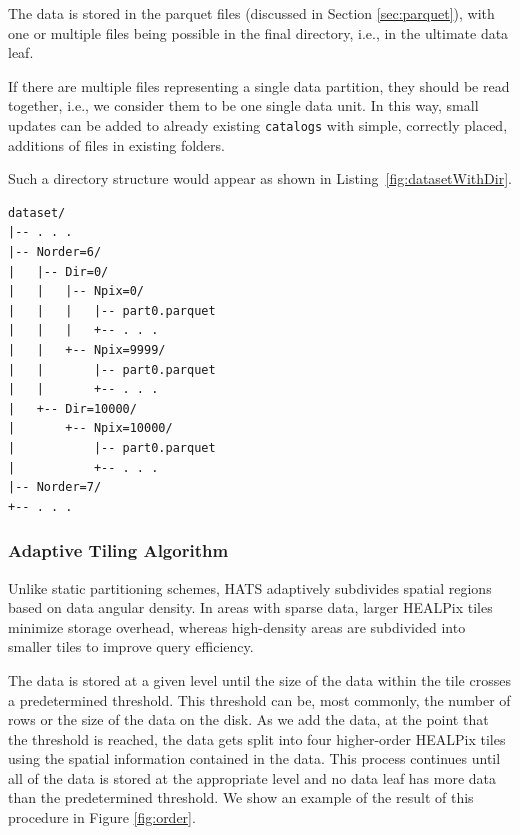 \documentclass[11pt,a4paper]{ivoa}
\begin{document}
The data is stored in the parquet files (discussed in Section \ref{sec:parquet}), with one or multiple files being possible in the final directory, i.e., in the ultimate data leaf.  \par 
If there are multiple files representing a single data partition, they should be read together, i.e., we consider them to be one single data unit. 
In this way, small updates can be added to already existing  \texttt{catalogs} with simple, correctly placed, additions of files in existing folders.

Such a directory structure would appear as shown in Listing~\ref{fig:datasetWithDir}.

\begin{minipage}{\linewidth}
\begin{lstlisting}[caption=Example catalog dataset directory contents with leaf directories, label=fig:datasetWithDir]
dataset/
|-- . . .
|-- Norder=6/
|   |-- Dir=0/
|   |   |-- Npix=0/
|   |   |   |-- part0.parquet
|   |   |   +-- . . .
|   |   +-- Npix=9999/
|   |       |-- part0.parquet
|   |       +-- . . .
|   +-- Dir=10000/
|       +-- Npix=10000/
|           |-- part0.parquet
|           +-- . . .
|-- Norder=7/
+-- . . .
\end{lstlisting} 
\end{minipage} 

\subsubsection{Adaptive Tiling Algorithm} \label{sec:adaptive}
Unlike static partitioning schemes, HATS adaptively subdivides spatial regions based on data angular density. 
In areas with sparse data, larger HEALPix tiles minimize storage overhead, whereas high-density areas are subdivided into smaller tiles to improve query efficiency. \par

The data is stored at a given level until the size of the data within the tile crosses a predetermined threshold. 
This threshold can be, most commonly, the number of rows or the size of the data on the disk. 
As we add the data, at the point that the threshold is reached, the data gets split into four higher-order HEALPix tiles using the spatial information contained in the data. 
This process continues until all of the data is stored at the appropriate level and no data leaf has more data than the predetermined threshold. We show an example of the result of this procedure in Figure \ref{fig:order}.
\end{document}
